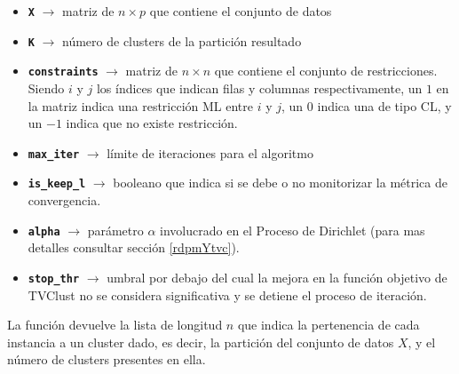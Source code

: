 \begin{itemize}
	
	\item \textbf{\texttt{X}} {$\longrightarrow$ matriz de $n \times p$ que contiene el conjunto de datos}
	
	\item \textbf{\texttt{K}} {$\longrightarrow$ número de clusters de la partición resultado}
	
	\item \textbf{\texttt{constraints}} {$\longrightarrow$ matriz de $n \times n$ que contiene el conjunto de restricciones. Siendo $i$ y $j$ los índices que indican filas y columnas respectivamente, un $1$ en la matriz indica una restricción \acs{ML} entre $i$ y $j$, un $0$ indica una de tipo \acs{CL}, y un $-1$ indica que no existe restricción.}
	
	\item \textbf{\texttt{max\_iter}} {$\longrightarrow$ límite de iteraciones para el algoritmo}
	
	\item \textbf{\texttt{is\_keep\_l}} {$\longrightarrow$ booleano que indica si se debe o no monitorizar la métrica de convergencia.}
	
	\item \textbf{\texttt{alpha}} {$\longrightarrow$ parámetro $\alpha$ involucrado en el Proceso de Dirichlet (para mas detalles consultar sección \ref{rdpmYtvc}).}
	
	\item \textbf{\texttt{stop\_thr}} {$\longrightarrow$ umbral por debajo del cual la mejora en la función objetivo de \acs{TVClust} no se considera significativa y se detiene el proceso de iteración.}
	
\end{itemize}

La función devuelve la lista de longitud $n$ que indica la pertenencia de cada instancia a un cluster dado, es decir, la partición del conjunto de datos $X$, y el número de clusters presentes en ella.








